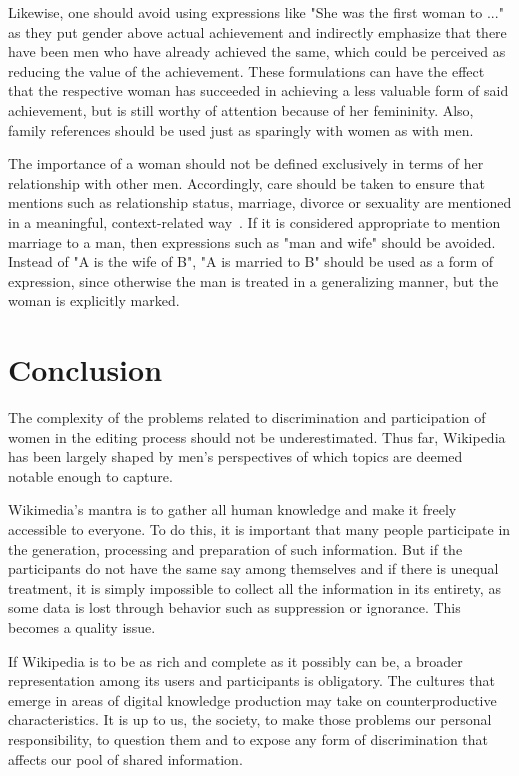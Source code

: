 \documentclass[a4paper, 11pt]{article}
\begin{document}
Likewise, one should avoid using expressions like "She was the first woman to ..." as they put gender above actual achievement and indirectly emphasize that there have been men who have already achieved the same, which could be perceived as reducing the value of the achievement. These formulations can have the effect that the respective woman has succeeded in achieving a less valuable form of said achievement, but is still worthy of attention because of her femininity. Also, family references should be used just as sparingly with women as with men.

The importance of a woman should not be defined exclusively in terms of her relationship with other men. Accordingly, care should be taken to ensure that mentions such as relationship status, marriage, divorce or sexuality are mentioned in a meaningful, context-related way~\cite{graells2015first}. If it is considered appropriate to mention marriage to a man, then expressions such as "man and wife" should be avoided. Instead of "A is the wife of B", "A is married to B" should be used as a form of expression, since otherwise the man is treated in a generalizing manner, but the woman is explicitly marked.

\section{Conclusion} \label{sec:conclusion}
The complexity of the problems related to discrimination and participation of women in the editing process should not be underestimated. Thus far, Wikipedia has been largely shaped by men’s perspectives of which topics are deemed notable enough to capture.

Wikimedia’s mantra is to gather all human knowledge and make it freely accessible to everyone. To do this, it is important that many people participate in the generation, processing and preparation of such information. But if the participants do not have the same say among themselves and if there is unequal treatment, it is simply impossible to collect all the information in its entirety, as some data is lost through behavior such as suppression or ignorance. This becomes a quality issue.

If Wikipedia is to be as rich and complete as it possibly can be, a broader representation among its users and participants is obligatory. The cultures that emerge in areas of digital knowledge production may take on counterproductive characteristics. It is up to us, the society, to make those problems our personal responsibility, to question them and to expose any form of discrimination that affects our pool of shared information.




\doclicenseThis
\end{document}
